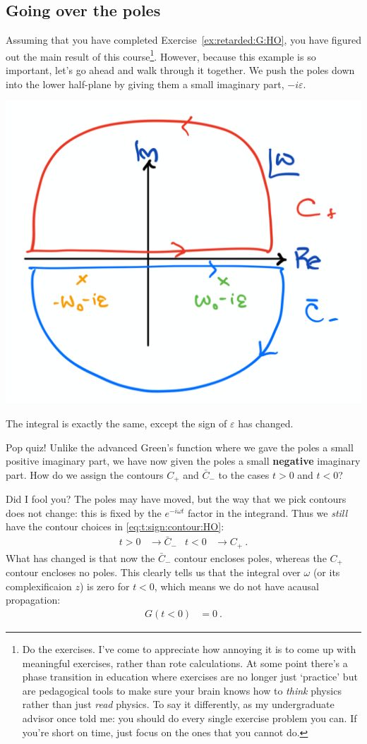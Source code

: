 \subsection{Going over the poles}

Assuming that you have completed Exercise~\ref{ex:retarded:G:HO}, you have figured out the main result of this course\footnote{Do the exercises. I've come to appreciate how annoying it is to come up with meaningful exercises, rather than rote calculations. At some point there's a phase transition in education where exercises are no longer just `practice' but are pedagogical tools to make sure your brain knows how to \emph{think} physics rather than just \emph{read} physics. To say it differently, as my undergraduate advisor once told me: you should do every single exercise problem you can. If you're short on time, just focus on the ones that you cannot do.}. However, because this example is so important, let's go ahead and walk through it together. We push the poles down into the lower half-plane by giving them a small imaginary part, $-i\varepsilon$.

\begin{center}
\includegraphics[width=.4\textwidth]{figures/Lec_2017_16_pokedown.pdf}
\end{center}

The integral is exactly the same, except the sign of $\varepsilon$ has changed. 
\begin{exercise}
Pop quiz! Unlike the advanced Green's function where we gave the poles a small positive imaginary part, we have now given the poles a small \textbf{negative} imaginary part. How do we assign the contours $C_+$ and $\bar C_-$ to the cases $t>0$ and $t<0$?
\end{exercise}
Did I fool you? The poles may have moved, but the way that we pick contours does not change: this is fixed by the $e^{-i\omega t}$ factor in the integrand. Thus we \emph{still} have the contour choices in \eqref{eq:t:sign:contour:HO}:
\begin{align}
	t>0 &\to \bar C_{-} 
	&
	t<0 &\to C_+ \ .
\end{align}
What has changed is that now the $\bar C_{-}$ contour encloses poles, whereas the $C_+$ contour encloses no poles. This clearly tells us that the integral over $\omega$ (or its complexificaion $z$) is zero for $t<0$, which means we do not have acausal propagation: 
\begin{align}
	G(t<0) &= 0 \ .
	\label{eq:HO:G:ret:acausal}
\end{align}


